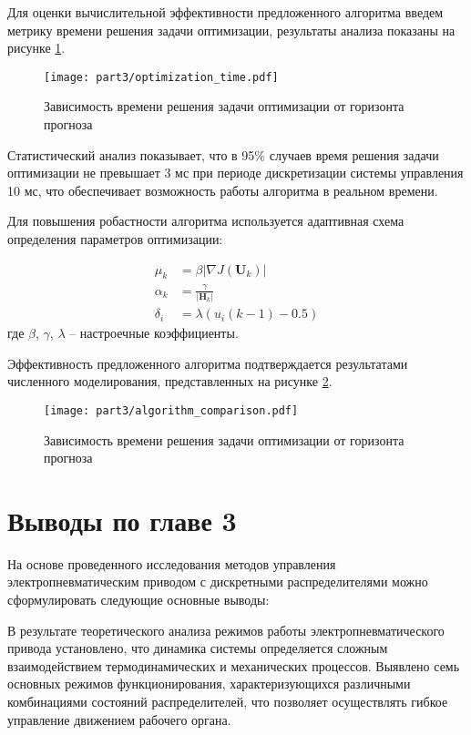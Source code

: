 Для оценки вычислительной эффективности предложенного алгоритма введем метрику времени решения задачи
оптимизации, результаты анализа показаны на рисунке \ref{fig:optimization_time}.

\begin{figure}[ht]
	\centering
	\texttt{[image: part3/optimization\_time.pdf]}
	\caption{Зависимость времени решения задачи оптимизации от горизонта прогноза}\label{fig:optimization_time}
\end{figure}

Статистический анализ показывает, что в 95\% случаев время решения задачи
оптимизации не превышает 3 мс при периоде дискретизации системы управления
10 мс, что обеспечивает возможность работы алгоритма в реальном времени.

Для повышения робастности алгоритма используется адаптивная схема определения
параметров оптимизации:

\begin{equation*}
\begin{aligned}
\mu_k &= \beta|\nabla J(\mathbf{U}_k)| \\
\alpha_k &= \frac{\gamma}{|\mathbf{H}_k|} \\
\delta_i &= \lambda(u_i(k-1) - 0.5)
\end{aligned}
\end{equation*}
где $\beta$, $\gamma$, $\lambda$ -- настроечные коэффициенты.

Эффективность предложенного алгоритма подтверждается результатами численного моделирования, представленных на рисунке \ref{fig:time_compar}.	

\begin{figure}[ht]
	\centering
	\texttt{[image: part3/algorithm\_comparison.pdf]}
	\caption{Зависимость времени решения задачи оптимизации от горизонта прогноза}\label{fig:time_compar}
\end{figure}

\section{Выводы по главе 3}
На основе проведенного исследования методов управления электропневматическим приводом с дискретными распределителями можно сформулировать следующие основные выводы:

В результате теоретического анализа режимов работы электропневматического привода установлено, что динамика системы определяется сложным взаимодействием термодинамических и
механических процессов. Выявлено семь основных режимов функционирования, характеризующихся различными комбинациями состояний распределителей, что позволяет осуществлять
гибкое управление движением рабочего органа.

